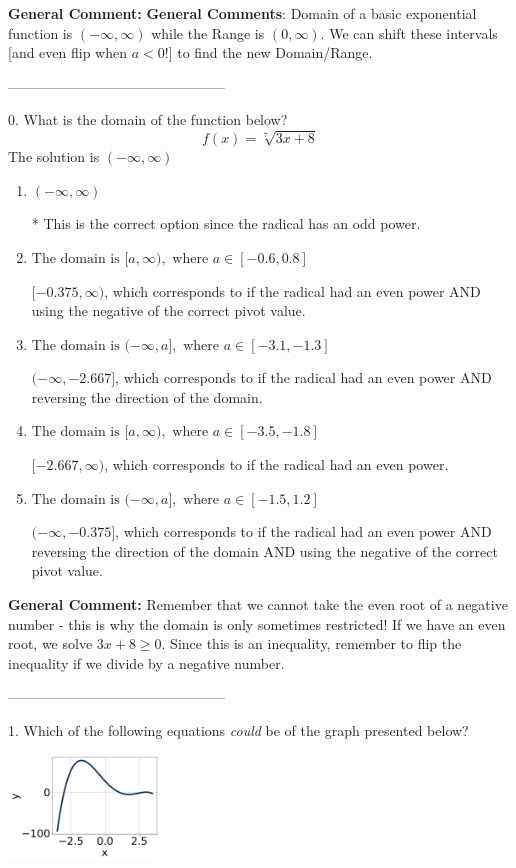 \documentclass{extbook}[14pt]
\begin{document}
\textbf{General Comment:} \textbf{General Comments}: Domain of a basic exponential function is $(-\infty, \infty)$ while the Range is $(0, \infty)$. We can shift these intervals [and even flip when $a<0$!] to find the new Domain/Range. 

-----------------------------------------------

0. What is the domain of the function below?
\[ f(x) = \sqrt[7]{3 x + 8} \] 
The solution is $ (-\infty, \infty) $ 

\begin{enumerate}[label=\Alph*.] 
\item $ (-\infty, \infty) $ 

 * This is the correct option since the radical has an odd power. 
\item $ \text{The domain is } [a, \infty), \text{   where } a \in [-0.6, 0.8] $ 

 $[-0.375, \infty)$, which corresponds to if the radical had an even power AND using the negative of the correct pivot value. 
\item $ \text{The domain is } (-\infty, a], \text{   where } a \in [-3.1, -1.3] $ 

 $(-\infty, -2.667]$, which corresponds to if the radical had an even power AND reversing the direction of the domain. 
\item $ \text{The domain is } [a, \infty), \text{   where } a \in [-3.5, -1.8] $ 

 $[-2.667, \infty)$, which corresponds to if the radical had an even power. 
\item $ \text{The domain is } (-\infty, a], \text{   where } a \in [-1.5, 1.2] $ 

 $(-\infty, -0.375]$, which corresponds to if the radical had an even power AND reversing the direction of the domain AND using the negative of the correct pivot value. 
\end{enumerate} 
 
\textbf{General Comment:} Remember that we cannot take the even root of a negative number - this is why the domain is only sometimes restricted! If we have an even root, we solve $3 x + 8 \geq 0$. Since this is an inequality, remember to flip the inequality if we divide by a negative number. 

-----------------------------------------------

1. Which of the following equations \textit{could} be of the graph presented below?
\begin{center} \includegraphics[width=0.3\textwidth]{../Figures/polyGraphToFunctionC.png} \end{center} 
\end{document}
